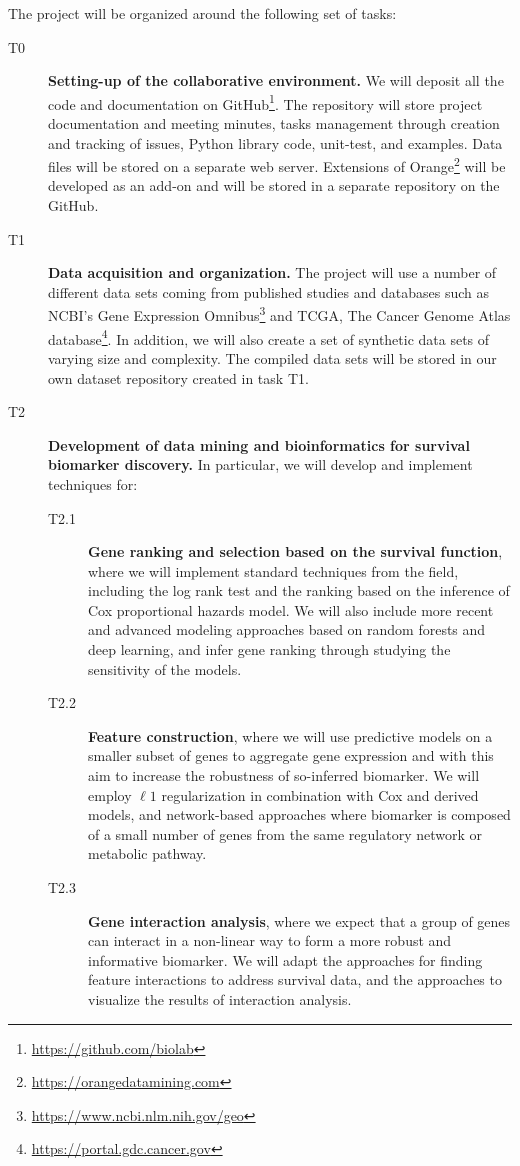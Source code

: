 \documentclass[11pt,a4paper]{article}
\newcommand{\myurl}[1]{\footnote{\url{#1}}}
\renewcommand{\bold}{\textbf}
\begin{document}
The project will be organized around the following set of tasks:
\begin{description}
	\item[T0] \bold{Setting-up of the collaborative environment.} We will deposit all the code and documentation on GitHub\myurl{https://github.com/biolab}. The repository will store project documentation and meeting minutes, tasks management through creation and tracking of issues, Python library code, unit-test, and examples. Data files will be stored on a separate web server. Extensions of Orange\myurl{https://orangedatamining.com} will be developed as an add-on and will be stored in a separate repository on the GitHub.
	\item[T1] \bold{Data acquisition and organization.} The project will use a number of different data sets coming from published studies and databases such as NCBI's Gene Expression Omnibus\myurl{https://www.ncbi.nlm.nih.gov/geo} and TCGA, The Cancer Genome Atlas database\myurl{https://portal.gdc.cancer.gov}. In addition, we will also create a set of synthetic data sets of varying size and complexity. The compiled data sets will be stored in our own dataset repository created in task T1.
	\item[T2] \bold{Development of data mining and bioinformatics for survival biomarker discovery.} In particular, we will develop and implement techniques for:
	\begin{description}
		\item[T2.1] \bold{Gene ranking and selection based on the survival function}, where we will implement standard techniques from the field, including the log rank test and the ranking based on the inference of Cox proportional hazards model. We will also include more recent and advanced modeling approaches based on random forests and deep learning, and infer gene ranking through studying the sensitivity of the models.
		\item[T2.2] \bold{Feature construction}, where we will use predictive models on a smaller subset of genes to aggregate gene expression and with this aim to increase the robustness of so-inferred biomarker. We will employ $\ell 1$ regularization in combination with Cox and derived models, and network-based approaches where biomarker is composed of a small number of genes from the same regulatory network or metabolic pathway.
		\item[T2.3] \bold{Gene interaction analysis}, where we expect that a group of genes can interact in a non-linear way to form a more robust and informative biomarker. We will adapt the approaches for finding feature interactions to address survival data, and the approaches to visualize the results of interaction analysis.

\end{description}
\end{description}
\end{document}
